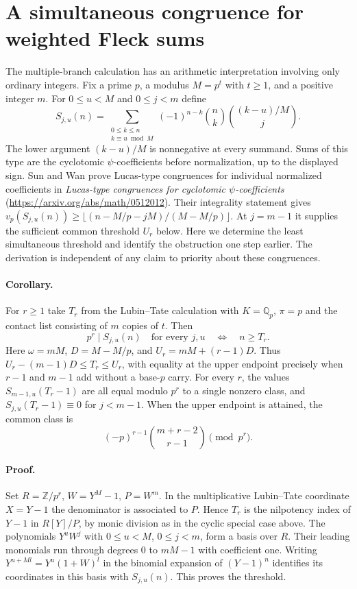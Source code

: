 \section{A simultaneous congruence for weighted Fleck sums}
The multiple-branch calculation has an arithmetic interpretation involving only ordinary integers. Fix a prime $p$, a modulus $M=p^t$ with $t\ge1$, and a positive integer $m$. For $0\le u<M$ and $0\le j<m$ define
\[
 S_{j,u}(n)=\sum_{\substack{0\le k\le n\\ k\equiv u\bmod M}}
 (-1)^{n-k}\binom nk\binom{(k-u)/M}{j}.
\]
The lower argument $(k-u)/M$ is nonnegative at every summand. Sums of this type are the cyclotomic $\psi$-coefficients before normalization, up to the displayed sign. Sun and Wan prove Lucas-type congruences for individual normalized coefficients in \emph{Lucas-type congruences for cyclotomic $\psi$-coefficients} (\url{https://arxiv.org/abs/math/0512012}). Their integrality statement gives $v_p(S_{j,u}(n))\ge\lfloor(n-M/p-jM)/(M-M/p)\rfloor$. At $j=m-1$ it supplies the sufficient common threshold $U_r$ below. Here we determine the least simultaneous threshold and identify the obstruction one step earlier. The derivation is independent of any claim to priority about these congruences.

\paragraph{Corollary.}
For $r\ge1$ take $T_r$ from the Lubin--Tate calculation with $K=\mathbb Q_p$, $\pi=p$ and the contact list consisting of $m$ copies of $t$. Then
\[
  p^r\mid S_{j,u}(n)\quad\text{for every }j,u
  \quad\Longleftrightarrow\quad n\ge T_r.
\]
Here $\omega=mM$, $D=M-M/p$, and $U_r=mM+(r-1)D$. Thus
$U_r-(m-1)D\le T_r\le U_r$, with equality at the upper endpoint precisely when $r-1$ and $m-1$ add without a base-$p$ carry. For every $r$, the values $S_{m-1,u}(T_r-1)$ are all equal modulo $p^r$ to a single nonzero class, and $S_{j,u}(T_r-1)\equiv0$ for $j<m-1$. When the upper endpoint is attained, the common class is
\[
            (-p)^{r-1}\binom{m+r-2}{r-1}\pmod {p^r}.
\]
\paragraph{Proof.}
Set $R=\mathbb Z/p^r$, $W=Y^M-1$, $P=W^m$. In the multiplicative Lubin--Tate coordinate $X=Y-1$ the denominator is associated to $P$. Hence $T_r$ is the nilpotency index of $Y-1$ in $R[Y]/P$, by monic division as in the cyclic special case above. The polynomials $Y^uW^j$ with $0\le u<M$, $0\le j<m$, form a basis over $R$. Their leading monomials run through degrees $0$ to $mM-1$ with coefficient one. Writing $Y^{u+Ml}=Y^u(1+W)^l$ in the binomial expansion of $(Y-1)^n$ identifies its coordinates in this basis with $S_{j,u}(n)$. This proves the threshold.

